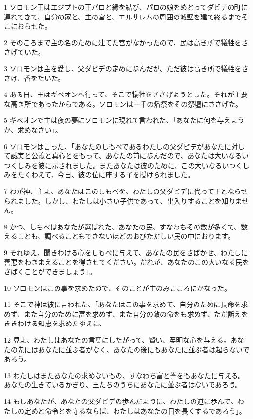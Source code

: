 \par 1 ソロモン王はエジプトの王パロと縁を結び、パロの娘をめとってダビデの町に連れてきて、自分の家と、主の宮と、エルサレムの周囲の城壁を建て終るまでそこにおらせた。
\par 2 そのころまで主の名のために建てた宮がなかったので、民は高き所で犠牲をささげていた。
\par 3 ソロモンは主を愛し、父ダビデの定めに歩んだが、ただ彼は高き所で犠牲をささげ、香をたいた。
\par 4 ある日、王はギベオンへ行って、そこで犠牲をささげようとした。それが主要な高き所であったからである。ソロモンは一千の燔祭をその祭壇にささげた。
\par 5 ギベオンで主は夜の夢にソロモンに現れて言われた、「あなたに何を与えようか、求めなさい」。
\par 6 ソロモンは言った、「あなたのしもべであるわたしの父ダビデがあなたに対して誠実と公義と真心とをもって、あなたの前に歩んだので、あなたは大いなるいつくしみを彼に示されました。またあなたは彼のために、この大いなるいつくしみをたくわえて、今日、彼の位に座する子を授けられました。
\par 7 わが神、主よ、あなたはこのしもべを、わたしの父ダビデに代って王とならせられました。しかし、わたしは小さい子供であって、出入りすることを知りません。
\par 8 かつ、しもべはあなたが選ばれた、あなたの民、すなわちその数が多くて、数えることも、調べることもできないほどのおびただしい民の中におります。
\par 9 それゆえ、聞きわける心をしもべに与えて、あなたの民をさばかせ、わたしに善悪をわきまえることを得させてください。だれが、あなたのこの大いなる民をさばくことができましょう」。
\par 10 ソロモンはこの事を求めたので、そのことが主のみこころにかなった。
\par 11 そこで神は彼に言われた、「あなたはこの事を求めて、自分のために長命を求めず、また自分のために富を求めず、また自分の敵の命をも求めず、ただ訴えをききわける知恵を求めたゆえに、
\par 12 見よ、わたしはあなたの言葉にしたがって、賢い、英明な心を与える。あなたの先にはあなたに並ぶ者がなく、あなたの後にもあなたに並ぶ者は起らないであろう。
\par 13 わたしはまたあなたの求めないもの、すなわち富と誉をもあなたに与える。あなたの生きているかぎり、王たちのうちにあなたに並ぶ者はないであろう。
\par 14 もしあなたが、あなたの父ダビデの歩んだように、わたしの道に歩んで、わたしの定めと命令とを守るならば、わたしはあなたの日を長くするであろう」。
